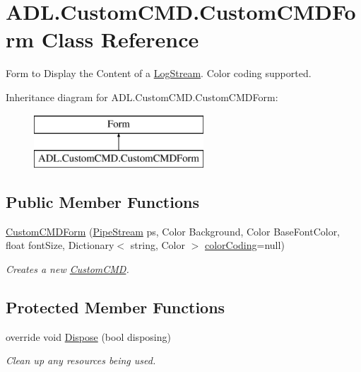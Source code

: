 \hypertarget{class_a_d_l_1_1_custom_c_m_d_1_1_custom_c_m_d_form}{}\section{A\+D\+L.\+Custom\+C\+M\+D.\+Custom\+C\+M\+D\+Form Class Reference}
\label{class_a_d_l_1_1_custom_c_m_d_1_1_custom_c_m_d_form}


Form to Display the Content of a \mbox{\hyperlink{class_a_d_l_1_1_log_stream}{Log\+Stream}}. Color coding supported.  


Inheritance diagram for A\+D\+L.\+Custom\+C\+M\+D.\+Custom\+C\+M\+D\+Form\+:\begin{figure}[H]
\begin{center}
\leavevmode
\includegraphics[height=2.000000cm]{class_a_d_l_1_1_custom_c_m_d_1_1_custom_c_m_d_form}
\end{center}
\end{figure}
\subsection*{Public Member Functions}
\begin{DoxyCompactItemize}
\item 
\mbox{\hyperlink{class_a_d_l_1_1_custom_c_m_d_1_1_custom_c_m_d_form_a949c39b280cf0d3fe4490c8731078bad}{Custom\+C\+M\+D\+Form}} (\mbox{\hyperlink{class_a_d_l_1_1_pipe_stream}{Pipe\+Stream}} ps, Color Background, Color Base\+Font\+Color, float font\+Size, Dictionary$<$ string, Color $>$ \mbox{\hyperlink{class_a_d_l_1_1_custom_c_m_d_1_1_custom_c_m_d_form_a705b940da9cebdc776afa008f2fe9bd7}{color\+Coding}}=null)
\begin{DoxyCompactList}\small\item\em Creates a new \mbox{\hyperlink{namespace_a_d_l_1_1_custom_c_m_d}{Custom\+C\+MD}}. \end{DoxyCompactList}\end{DoxyCompactItemize}
\subsection*{Protected Member Functions}
\begin{DoxyCompactItemize}
\item 
override void \mbox{\hyperlink{class_a_d_l_1_1_custom_c_m_d_1_1_custom_c_m_d_form_a17d8b37ecf0237238b3f2f988a4ec700}{Dispose}} (bool disposing)
\begin{DoxyCompactList}\small\item\em Clean up any resources being used. \end{DoxyCompactList}\end{DoxyCompactItemize}

